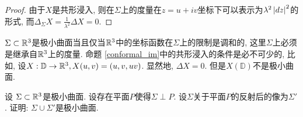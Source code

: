 \begin{proof}
    由于$X$是共形浸入, 则在$\Sigma$上的度量在$z=u+iv$坐标下可以表示为$\lambda^2\left | dz \right |^2$的形式, 而$\Delta_\Sigma X= \frac{1}{\lambda^2} \Delta X=0$.
\end{proof}
\begin{remark}
    $\Sigma\subset \mathbb{R}^3$是极小曲面当且仅当$\mathbb{R}^3$中的坐标函数在$\Sigma$上的限制是调和的, 这里$\Sigma$上必须是继承自$\mathbb{R}^3$上的度量. 命题 \eqref{conformal_im}中的共形浸入的条件是必不可少的, 比如, 设$X:\mathbb{D}\to \mathbb{R}^3, X(u,v)=(u,v,uv)$. 显然地, $\Delta X=0$. 但是$X(\mathbb{D})$不是极小曲面.
\end{remark}
\begin{exercise}
    设 $\Sigma \subset \mathbb{R}^3$是极小曲面. 设存在平面$P$使得$\Sigma \perp P$. 设$\Sigma$关于平面$P$的反射后的像为$\Sigma'$. 证明: $\Sigma \cup \Sigma'$是极小曲面.
\end{exercise}
